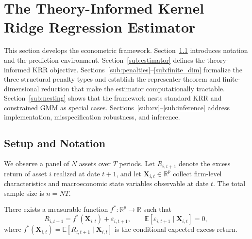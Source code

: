 
\section{The Theory-Informed Kernel Ridge Regression Estimator}
\label{sec:framework}

This section develops the econometric framework.
Section~\ref{sub:setup} introduces notation and the prediction environment.
Section~\ref{sub:estimator} defines the theory-informed KRR objective.
Sections~\ref{sub:penalties}--\ref{sub:finite_dim} formalize the three structural penalty types
and establish the representer theorem and finite-dimensional reduction that
make the estimator computationally tractable.
Section~\ref{sub:nesting} shows that the framework nests standard KRR
and constrained GMM as special cases.
Sections~\ref{sub:cv}--\ref{sub:inference} address implementation, misspecification
robustness, and inference.

\subsection{Setup and Notation}
\label{sub:setup}

We observe a panel of $N$ assets over $T$ periods.
Let $R_{i,t+1}$ denote the excess return of asset $i$ realized at date $t+1$,
and let $\mathbf{X}_{i,t} \in \mathbb{R}^p$ collect firm-level characteristics
and macroeconomic state variables observable at date $t$.
The total sample size is $n = NT$.

\begin{assumption}
\label{ass:dgp}
There exists a measurable function $f^{*}: \mathbb{R}^{p} \to \mathbb{R}$
such that
\begin{equation}
\label{eq:dgp}
R_{i,t+1} = f^{*}(\mathbf{X}_{i,t}) + \varepsilon_{i,t+1},
\qquad
\mathbb{E}[\varepsilon_{i,t+1} \mid \mathbf{X}_{i,t}] = 0,
\end{equation}
where $f^{*}(\mathbf{X}_{i,t}) = \mathbb{E}[R_{i,t+1} \mid \mathbf{X}_{i,t}]$
is the conditional expected excess return.
\end{assumption}

